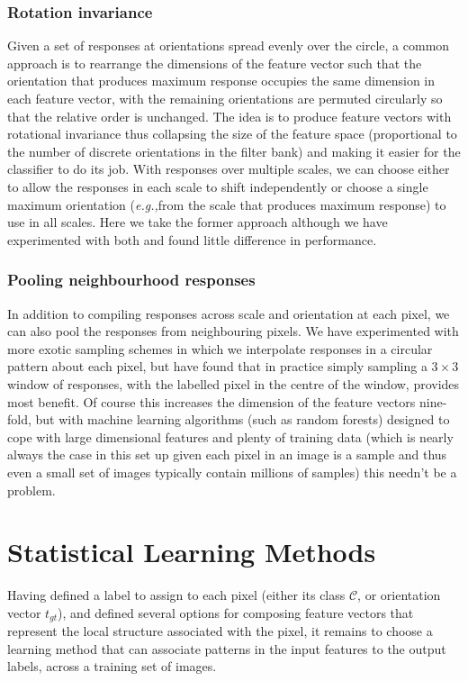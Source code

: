 \documentclass{IEEEtran}
\def\eg{\emph{e.g.,}}
\begin{document}
\subsubsection{Rotation invariance}
\label{s:composing_features_rotation}
Given a set of responses at orientations spread evenly over the circle, a common approach is to rearrange the dimensions of the feature vector such that the orientation that produces maximum response occupies the same dimension in each feature vector, with the remaining orientations are permuted circularly so that the relative order is unchanged. The idea is to produce feature vectors with rotational invariance thus collapsing the size of the feature space (proportional to the number of discrete orientations in the filter bank) and making it easier for the classifier to do its job. With responses over multiple scales, we can choose either to allow the responses in each scale to shift independently or choose a single maximum orientation (\eg from the scale that produces maximum response) to use in all scales. Here we take the former approach although we have experimented with both and found little difference in performance.

\subsubsection{Pooling neighbourhood responses}
\label{s:composing_features_neighbours}
In addition to compiling responses across scale and orientation at each pixel, we can also pool the responses from neighbouring pixels. We have experimented with more exotic sampling schemes in which we interpolate responses in a circular pattern about each pixel, but have found that in practice simply sampling a $3\times3$ window of responses, with the labelled pixel in the centre of the window, provides most benefit. Of course this increases the dimension of the feature vectors nine-fold, but with machine learning algorithms (such as random forests) designed to cope with large dimensional features and plenty of training data (which is nearly always the case in this set up given each pixel in an image is a sample and thus even a small set of images typically contain millions of samples) this needn't be a problem.

\section{Statistical Learning Methods}
\label{s:learning_methods}
Having defined a label to assign to each pixel (either its class $\mathcal{C}$, or orientation vector $t_{gt}$), and defined several options for composing feature vectors that represent the local structure associated with the pixel, it remains to choose a learning method that can associate patterns in the input features to the output labels, across a training set of images.
\end{document}
